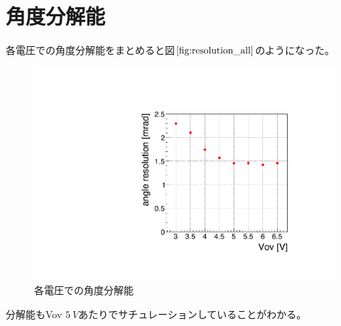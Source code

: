 \documentclass[uplatex, titlepage, dvipdfmx, 12pt, a4paper]{jsreport}
\begin{document}
  \section{角度分解能}
    各電圧での角度分解能をまとめると図$\ref{fig:resolution_all}$のようになった。
    \begin{figure}[h]
      \begin{center} 
        \includegraphics[scale=0.4, clip]{image/resolutin_allV.pdf}
        \caption{各電圧での角度分解能} 
        \label{fig:resolution_all} 
      \end{center}
    \end{figure}
    分解能もVov $\SI{5}{V}$あたりでサチュレーションしていることがわかる。
\end{document}
